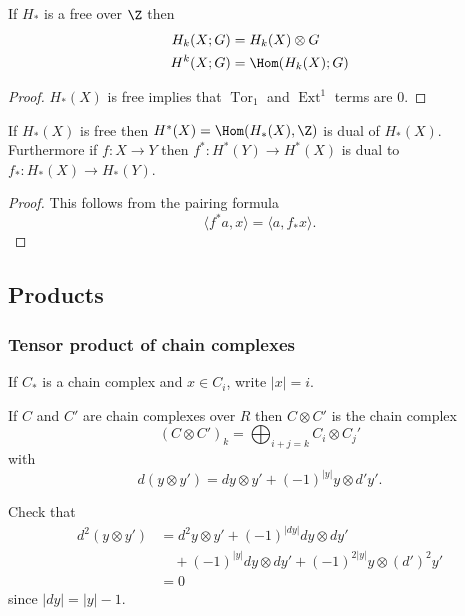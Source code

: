 \documentclass[a4paper]{article}
\DeclareMathOperator{\Tor}{Tor} %
\DeclareMathOperator{\Ext}{Ext} %
\begin{document}
\begin{corollary}
  If \(H_*\) is a free over \(\Z\) then
  \begin{align*}
    H_k(X; G) &= H_k(X) \otimes G \\
    H^k(X; G) &= \Hom(H_k(X); G)
  \end{align*}
\end{corollary}

\begin{proof}
  \(H_*(X)\) is free implies that \(\Tor_1\) and \(\Ext^1\) terms are \(0\).
\end{proof}

\begin{corollary}
  If \(H_*(X)\) is free then \(H^*(X) = \Hom(H_*(X), \Z)\) is dual of \(H_*(X)\). Furthermore if \(f: X \to Y\) then \(f^*: H^*(Y) \to H^*(X)\) is dual to \(f_*: H_*(X) \to H_*(Y)\).
\end{corollary}

\begin{proof}
  This follows from the pairing formula
  \[
    \langle f^*a, x \rangle = \langle a, f_* x\rangle.
  \]
\end{proof}

\subsection{Products}

\subsubsection{Tensor product of chain complexes}

\begin{notation}
  If \(C_*\) is a chain complex and \(x \in C_i\), write \(|x| = i\).
\end{notation}

\begin{definition}
  If \(C\) and \(C'\) are chain complexes over \(R\) then \(C \otimes C'\) is the chain complex
  \[
    (C \otimes C')_k = \bigoplus_{i + j = k} C_i \otimes C_j'
  \]
  with
  \[
    d(y \otimes y') = dy \otimes y' + (-1)^{|y|} y \otimes d'y'.
  \]
\end{definition}

Check that
\begin{align*}
  d^2(y \otimes y')
  &= d^2 y \otimes y' + (-1)^{|dy|} dy \otimes dy' \\
  &\quad + (-1)^{|y|} dy \otimes dy' + (-1)^{2|y|} y \otimes (d')^2 y' \\
  &= 0
\end{align*}
since \(|dy| = |y| - 1\).
\end{document}
